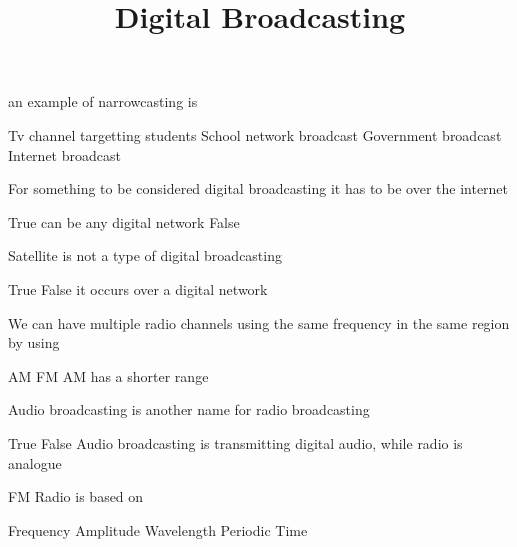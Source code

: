 \documentclass[theme=sleek, randomorder, hidesidemenu]{webquiz}
\title{Digital Broadcasting}
\begin{document}
\begin{question}
  an example of narrowcasting is
  \begin{choice}
    \incorrect Tv channel targetting students
    \correct School network broadcast
    \incorrect Government broadcast
    \incorrect Internet broadcast
  \end{choice}

\end{question}

\begin{question}
  For something to be considered digital broadcasting it has to be over the internet
  \begin{choice}
    \incorrect True \feedback can be any digital network
    \correct False
  \end{choice}

\end{question}

\begin{question}
  Satellite is not a type of digital broadcasting
  \begin{choice}
    \incorrect True
    \correct False \feedback it occurs over a digital network
  \end{choice}

\end{question}

\begin{question}
  We can have multiple radio channels using the same frequency in the same region by using
  \begin{choice}
    \correct AM
    \incorrect FM \feedback AM has a shorter range
  \end{choice}
\end{question}

\begin{question}
  Audio broadcasting is another name for radio broadcasting
  \begin{choice}
    \incorrect True
    \correct False
    \feedback Audio broadcasting is transmitting digital audio, while radio is analogue
  \end{choice}
\end{question}

\begin{question}
  FM Radio is based on
  \begin{choice}
    \correct Frequency
    \incorrect Amplitude
    \incorrect Wavelength
    \incorrect Periodic Time
  \end{choice}
\end{question}
\end{document}
